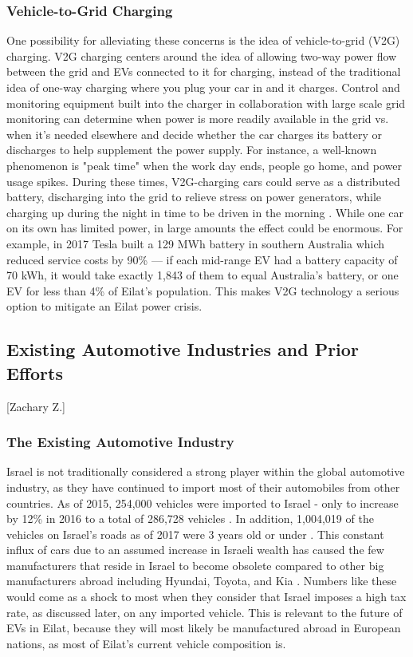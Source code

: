 \documentclass[12pt]{article}                         %
\begin{document}
\subsubsection{Vehicle-to-Grid Charging}
One possibility for alleviating these concerns is the idea of vehicle-to-grid (V2G) charging. V2G charging centers around the idea of allowing two-way power flow between the grid and EVs connected to it for charging, instead of the traditional idea of one-way charging where you plug your car in and it charges. Control and monitoring equipment built into the charger in collaboration with large scale grid monitoring can determine when power is more readily available in the grid vs. when it's needed elsewhere and decide whether the car charges its battery or discharges to help supplement the power supply. For instance, a well-known phenomenon is "peak time" when the work day ends, people go home, and power usage spikes. During these times, V2G-charging cars could serve as a distributed battery, discharging into the grid to relieve stress on power generators, while charging up during the night in time to be driven in the morning \cite{Mahmud2015PowerEV}. While one car on its own has limited power, in large amounts the effect could be enormous. For example, in 2017 Tesla built a 129 MWh battery in southern Australia which reduced service costs by 90\% \cite{Lambert2018Teslas90} --- if each mid-range EV had a battery capacity of 70 kWh, it would take exactly 1,843 of them to equal Australia's battery, or one EV for less than 4\% of Eilat's population. This makes V2G technology a serious option to mitigate an Eilat power crisis.

\subsection{Existing Automotive Industries and Prior Efforts}[Zachary Z.]

\subsubsection{The Existing Automotive Industry}
Israel is not traditionally considered a strong player within the global automotive industry, as they have continued to import most of their automobiles from other countries. As of 2015, 254,000 vehicles were imported to Israel - only to increase by 12\% in 2016 to a total of 286,728 vehicles \cite{Halavy20172016Imports}. In addition, 1,004,019 of the vehicles on Israel's roads as of 2017 were 3 years old or under \cite{Halavy20172016Imports}. This constant influx of cars due to an assumed increase in Israeli wealth has caused the few manufacturers that reside in Israel to become obsolete compared to other big manufacturers abroad including Hyundai, Toyota, and Kia \cite{CarLoanWorld2015TheAustrailia}. Numbers like these would come as a shock to most when they consider that Israel imposes a high tax rate, as discussed later, on any imported vehicle. This is relevant to the future of EVs in Eilat, because they will most likely be manufactured abroad in European nations, as most of Eilat's current vehicle composition is. 
\end{document}
